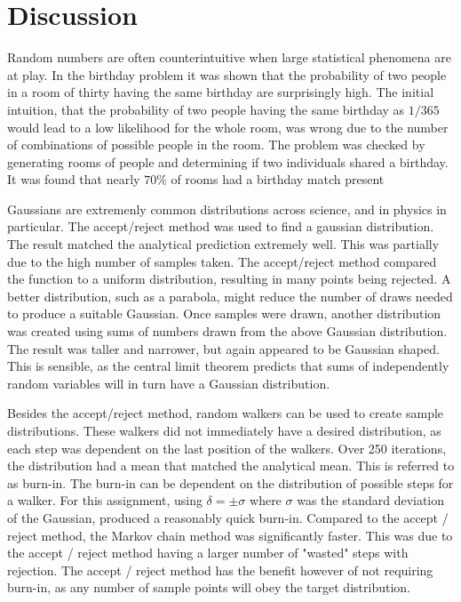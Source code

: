 \documentclass[twocolumn]{article}
\begin{document}
\section{Discussion}
Random numbers are often counterintuitive when large statistical phenomena are at play. In the birthday problem it was shown that the probability of two people in a room of thirty having the same birthday are surprisingly high. The initial intuition, that the probability of two people having the same birthday as $1/365$ would lead to a low likelihood for the whole room, was wrong due to the number of combinations of possible people in the room. The problem was checked by generating rooms of people and determining if two individuals shared a birthday. It was found that nearly $70\%$ of rooms had a birthday match present

Gaussians are extremenly common distributions across science, and in physics in particular. The accept/reject method was used to find a gaussian distribution. The result matched the analytical prediction extremely well. This was partially due to the high number of samples taken. The accept/reject method compared the function to a uniform distribution, resulting in many points being rejected. A better distribution, such as a parabola, might reduce the number of draws needed to produce a suitable Gaussian. Once samples were drawn, another distribution was created using sums of numbers drawn from the above Gaussian distribution. The result was taller and narrower, but again appeared to be Gaussian shaped. This is sensible, as the central limit theorem predicts that sums of independently random variables will in turn have a Gaussian distribution.


Besides the accept/reject method, random walkers can be used to create sample distributions. These walkers did not immediately have a desired distribution, as each step was dependent on the last position of the walkers. Over 250 iterations, the distribution had a mean that matched the analytical mean. This is referred to as burn-in. The burn-in can be dependent on the distribution of possible steps for a walker. For this assignment, using $\delta = \pm \sigma$ where $\sigma$ was the standard deviation of the Gaussian,  produced a reasonably quick burn-in. Compared to the accept / reject method, the Markov chain method was significantly faster. This was due to the accept / reject method having a larger number of "wasted" steps with rejection. The accept / reject method has the benefit however of not requiring burn-in, as any number of sample points will obey the target distribution.
\end{document}

